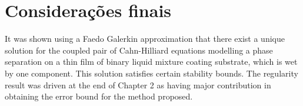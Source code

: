 \setcounter{equation}{0}
\chapter{Considerações finais}
It was shown using a Faedo Galerkin approximation that there exist a unique solution for  the coupled pair of Cahn-Hilliard equations
modelling  a phase separation on a thin
film of binary liquid mixture coating substrate, which is wet by one
component.  This solution satisfies certain stability
bounds. The regularity result was driven at the end of Chapter 2 as having
major contribution in obtaining the error bound for the method proposed.  


